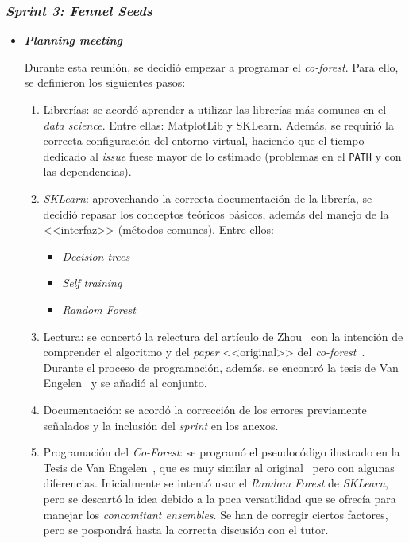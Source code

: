 \subsubsection{\textit{Sprint 3: Fennel Seeds}}
\begin{itemize}
	\item \textbf{\textit{Planning meeting}}
	
	Durante esta reunión, se decidió empezar a programar el \textit{co-forest}. Para ello, se definieron los siguientes pasos:
	
	\begin{enumerate}
		
		\item Librerías: se acordó aprender a utilizar las librerías más comunes en el \textit{data science}. Entre ellas: MatplotLib y SKLearn. Además, se requirió la correcta configuración del entorno virtual, haciendo que el tiempo dedicado al \textit{issue} fuese mayor de lo estimado (problemas en el \texttt{PATH} y con las dependencias).
		
		\item \textit{SKLearn}: aprovechando la correcta documentación de la librería, se decidió repasar los conceptos teóricos básicos, además del manejo de la <<interfaz>> (métodos comunes). Entre ellos:
		
		\begin{itemize}
			\item \textit{Decision trees}
			\item \textit{Self training}
			\item \textit{Random Forest}
		\end{itemize}
	
		\item Lectura: se concertó la relectura del artículo de Zhou~\cite{zhou2021SemisupervisedRecommendationAttack} con la intención de comprender el algoritmo y del \textit{paper} <<original>> del \textit{co-forest}~\cite{originalCoForest2007}. Durante el proceso de programación, además, se encontró la tesis de Van Engelen~\cite{engelen2018thesis} y se añadió al conjunto.
		\item Documentación: se acordó la corrección de los errores previamente señalados y la inclusión del \textit{sprint} en los anexos.
		\item Programación del \textit{Co-Forest}: se programó el pseudocódigo ilustrado en la Tesis de Van Engelen~\cite{engelen2018thesis}, que es muy similar al original~\cite{originalCoForest2007} pero con algunas diferencias. Inicialmente se intentó usar el \textit{Random Forest} de \textit{SKLearn}, pero se descartó la idea debido a la poca versatilidad que se ofrecía para manejar los \textit{concomitant ensembles}. Se han de corregir ciertos factores, pero se pospondrá hasta la correcta discusión con el tutor.
		

\end{enumerate}
\end{itemize}
